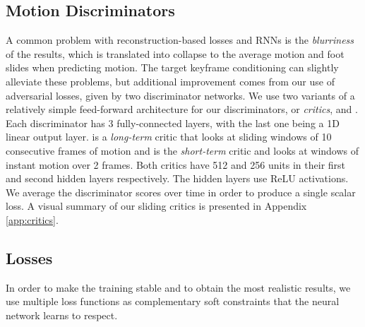 \documentclass[acmtog]{acmart}
\begin{document}
\subsection{Motion Discriminators}
A common problem with reconstruction-based losses and RNNs is the \textit{blurriness} of the results, which is translated into collapse to the average motion and foot slides when predicting motion. The target keyframe conditioning can slightly alleviate these problems, but additional improvement comes from our use of adversarial losses, given by two discriminator networks. We use two variants of a relatively simple feed-forward architecture for our discriminators, or \textit{critics},  and . Each discriminator has 3 fully-connected layers, with the last one being a 1D linear output layer.  is a \textit{long-term} critic that looks at sliding windows of 10 consecutive frames of motion and  is the \textit{short-term} critic and looks at windows of instant motion over 2 frames. Both critics have 512 and 256 units in their first and second hidden layers respectively. The hidden layers use ReLU activations. We average the discriminator scores over time in order to produce a single scalar loss. A visual summary of our sliding critics is presented in Appendix \ref{app:critics}.
\subsection{Losses}\label{sec:losses}
In order to make the training stable and to obtain the most realistic results, we use multiple loss functions as complementary soft constraints that the neural network learns to respect.
\end{document}

